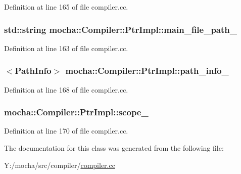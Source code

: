 Definition at line 165 of file compiler.cc.

\hypertarget{classmocha_1_1_compiler_1_1_ptr_impl_afcc8e563ce271f85ea12dc210e37aa25}{
\subsubsection[{main\_\-file\_\-path\_\-}]{\setlength{\rightskip}{0pt plus 5cm}std::string {\bf mocha::Compiler::PtrImpl::main\_\-file\_\-path\_\-}}}
\label{classmocha_1_1_compiler_1_1_ptr_impl_afcc8e563ce271f85ea12dc210e37aa25}


Definition at line 163 of file compiler.cc.

\hypertarget{classmocha_1_1_compiler_1_1_ptr_impl_a06189a50f7b98891cf31729de136e330}{
\subsubsection[{path\_\-info\_\-}]{$<${\bf PathInfo}$>$ {\bf mocha::Compiler::PtrImpl::path\_\-info\_\-}}}
\label{classmocha_1_1_compiler_1_1_ptr_impl_a06189a50f7b98891cf31729de136e330}


Definition at line 168 of file compiler.cc.

\hypertarget{classmocha_1_1_compiler_1_1_ptr_impl_a967217946616587d9925a71ac093355b}{
\subsubsection[{scope\_\-}]{ {\bf mocha::Compiler::PtrImpl::scope\_\-}}}
\label{classmocha_1_1_compiler_1_1_ptr_impl_a967217946616587d9925a71ac093355b}


Definition at line 170 of file compiler.cc.



The documentation for this class was generated from the following file:\begin{DoxyCompactItemize}
\item 
Y:/mocha/src/compiler/\hyperlink{compiler_8cc}{compiler.cc}\end{DoxyCompactItemize}

